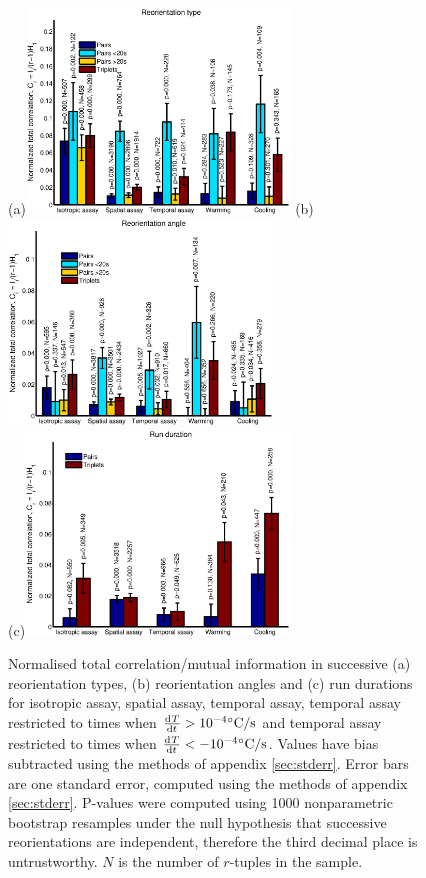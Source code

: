 \documentclass[12pt]{article}
\begin{document}
\begin{figure}
  \begin{center}
    (a)\includegraphics[width=7cm]{reotype.eps}
    (b)\includegraphics[width=7cm]{reoangle.eps}\\[1cm]
    (c)\includegraphics[width=7cm]{rundur.eps}
  \end{center}
  \caption{Normalised total correlation/mutual information in successive (a) reorientation types, (b) reorientation angles and (c) run durations for isotropic assay, spatial assay, temporal assay, temporal assay restricted to times when $\diff{T}{t} > 10^{-4}\mbox{}\dC/\mathrm{s}$ and temporal assay restricted to times when $\diff{T}{t} < -10^{-4}\mbox{}\dC/\mathrm{s}$. Values have bias subtracted using the methods of appendix \ref{sec:stderr}. Error bars are one standard error, computed using the methods of appendix \ref{sec:stderr}. P-values were computed using 1000 nonparametric bootstrap resamples under the null hypothesis that successive reorientations are independent, therefore the third decimal place is untrustworthy. $N$ is the number of $r$-tuples in the sample.} \label{fig:results}
\end{figure}
\end{document}
